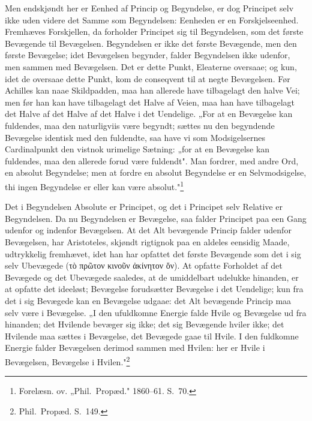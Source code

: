 \documentclass[12pt]{book}
\newcommand{\opage}[1]{\marginnote{\footnotesize\textit{[#1]}}}
\begin{document}
Men endskjøndt her er Eenhed af Princip og Begyndelse, er dog Principet selv ikke
uden videre det Samme som Begyndelsen: Eenheden er en Forskjelseenhed. Fremhæves
Forskjellen, da forholder Principet sig til Begyndelsen, som det første Bevægende til
Bevægelsen. Begyndelsen er ikke det første Bevægende, men den første Bevægelse; idet
Bevægelsen begynder, falder Begyndelsen ikke udenfor, men sammen med Bevægelsen. Det
er dette Punkt, Eleaterne oversaae; og kun, idet de oversaae dette Punkt, kom de
conseqvent til at negte Bevægelsen. Før Achilles kan naae Skildpadden, maa han
allerede have tilbagelagt den halve Vei; men før han kan have tilbagelagt det Halve
af Veien, maa han have tilbagelagt det Halve af det Halve af det Halve i det
Uendelige. „For at en Bevægelse kan fuldendes, maa den naturligviis være begyndt;
sættes nu den begyndende Bevægelse identisk med den fuldendte, saa have vi som
Modsigelsernes Cardinalpunkt den vistnok urimelige Sætning: „for at en Bevægelse kan
fuldendes, maa den allerede forud være fuldendt". Man fordrer, med andre Ord, en
absolut Begyndelse; men at fordre en absolut Begyndelse er en Selvmodsigelse, thi
ingen Begyndelse er eller kan være absolut."\footnote{Forelæsn. ov. „Phil.\ Propæd."
1860--61. S.~70.}

Det i Begyndelsen Absolute er Principet, og det i Principet selv Relative er
Begyndelsen. Da nu Begyndelsen er Bevægelse, saa falder Principet paa een Gang
udenfor og indenfor Bevægelsen. At det Alt bevægende Princip falder udenfor
Bevægelsen, har Aristoteles, skjøndt rigtignok paa en aldeles eensidig Maade,
udtrykkelig fremhævet, idet han har opfattet det første Bevægende som det i sig selv
Ubevægede (τὸ πρῶτον κινοῦν ἀκίνητον ὄν). At opfatte Forholdet
\opage{8} af det Bevægede og det Ubevægede saaledes, at de umiddelbart udelukke hinanden, er at
opfatte det ideeløst; Bevægelse forudsætter Bevægelse i det Uendelige; kun fra det i
sig Bevægede kan en Bevægelse udgaae: det Alt bevægende Princip maa selv være i
Bevægelse. „I den ufuldkomne Energie falde Hvile og Bevægelse ud fra hinanden; det
Hvilende bevæger sig ikke; det sig Bevægende hviler ikke; det Hvilende maa sættes i
Bevægelse, det Bevægede gaae til Hvile. I den fuldkomne Energie falder Bevægelsen
derimod sammen med Hvilen: her er Hvile i Bevægelsen, Bevægelse i
Hvilen."\footnote{Phil.\ Propæd. S.~149.}
\end{document}
